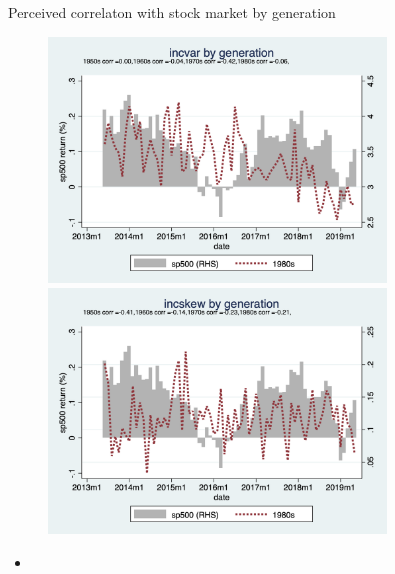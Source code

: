 \documentclass{beamer}
\begin{document}
\begin{frame}{Perceived correlaton with stock market by generation}
	\begin{figure}
		\centering
		\label{ts_stk_byear_g}
		\includegraphics[width=0.8\textwidth, height=\0.4\textheight]{figures/ts_incvar_byear_g_mean_stk} \\
			\includegraphics[width=0.8\textwidth, height=\0.4\textheight]{figures/ts_incskew_byear_g_mean_stk} 
	\end{figure}
	\begin{itemize}
		\item 
	\end{itemize}
\end{frame}
\end{document}
